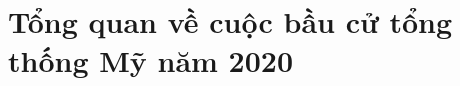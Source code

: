 \documentclass[14pt, a4paper]{article}
\numberwithin{equation}{section}
\numberwithin{figure}{section}
\numberwithin{dl}{section}
\numberwithin{md}{section}
\numberwithin{bd}{section}
\numberwithin{dn}{section}
\numberwithin{hq}{section}
\begin{document}
\begin{titlepage}





        \vfill %

    \end{titlepage}

    \cleardoublepage
    \tableofcontents
    \newpage
    \listoffigures
    \newpage
    \glsaddall 
    \renewcommand*{\glossaryname}{Danh mục các từ viết tắt}
    \renewcommand*{\acronymname}{Danh sách từ viết tắt}
    \renewcommand*{\entryname}{Viết tắt}
    \renewcommand*{\descriptionname}{Viết đầy đủ}
    \printnoidxglossary
    \cleardoublepage


    \newpage

    \nocite{*}

%
%

    \section{Tổng quan về cuộc bầu cử tổng thống Mỹ năm 2020}
\end{document}
